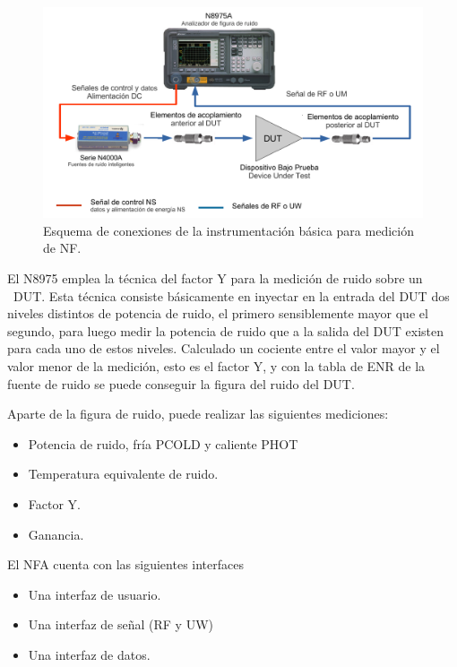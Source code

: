{\begin{figure}[h!]
	\centering
	\includegraphics[width=15cm]{./Imagenes/EsquemaConexionNFADUT.pdf}
	\caption{Esquema de conexiones de la instrumentación básica para medición de NF.}
\label{Fig:BancoPruebasFuenteRuido}
\end{figure}
El N8975 emplea la técnica del factor Y para la medición de ruido sobre un \ DUT. Esta técnica consiste básicamente en	inyectar en la entrada del DUT dos niveles distintos de potencia de ruido, el primero   sensiblemente mayor que el segundo, para luego medir la potencia de ruido que a la salida del DUT existen para cada uno de estos niveles.	Calculado un cociente entre el valor mayor y el valor menor de la medición, esto es el factor Y, y con la tabla de	ENR de la fuente de ruido se puede conseguir la figura del ruido del DUT.

Aparte de la figura de ruido, puede realizar las siguientes mediciones:

\begin{itemize}
	\item Potencia de ruido, fría PCOLD y caliente PHOT
	\item Temperatura equivalente de ruido.
	\item Factor Y.
	\item Ganancia.
\end{itemize}

El NFA cuenta con las siguientes interfaces

\begin{itemize}
	\item Una interfaz de usuario. 
	\item Una interfaz de señal (RF y UW)
	\item Una interfaz de datos.
\end{itemize}

}
